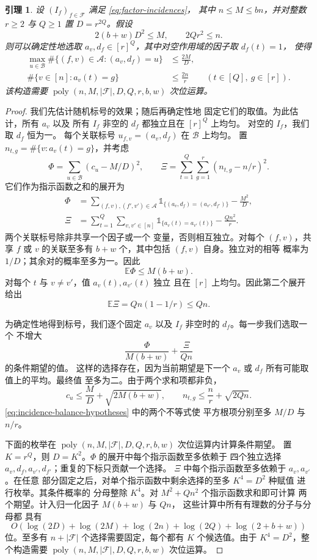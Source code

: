 \documentclass[11pt,reqno]{amsart}
\numberwithin{equation}{section}
\newtheorem{lemma}[theorem]{引理}
\theoremstyle{definition}\newtheorem{definition}[theorem]{定义}
\theoremstyle{remark}\newtheorem{remark}[theorem]{注}
\newcommand{\poly}{\operatorname{poly}}
\renewcommand{\le}{\leqslant}
\renewcommand{\ge}{\geqslant}
\begin{document}
\begin{lemma}\label{lem:incidence-labels}
设 $(I_f)_{f\in\mathcal F}$ 满足 \eqref{eq:factor-incidences}，
其中 $n\le M\le bn$，并对整数 $r\ge2$ 与
$Q\ge1$ 置 $D=r^{2Q}$。假设
\begin{equation}\label{eq:incidence-balance-hypotheses}
 2(b+w)D^2\le M,\qquad 2Qr^2\le n.
\end{equation}
则可以确定性地选取 $a_v,d_f\in[r]^Q$，其中对空作用域的因子取 $d_f(t)=1$，
使得
\[
 \begin{aligned}
 \max_{u\in\mathcal B}\#\{(f,v)\in\mathcal A:(a_v,d_f)=u\}
 &\le\frac{2M}{D},\\
 \#\{v\in[n]:a_v(t)=g\}&\le\frac{2n}{r}
 \qquad(t\in[Q],\ g\in[r]).
 \end{aligned}
\]
该构造需要
$\poly(n,M,|\mathcal F|,D,Q,r,b,w)$ 次位运算。
\end{lemma}
\begin{proof}
我们先估计随机标号的效果；随后再确定性地
固定它们的取值。为此估计，所有 $a_v$ 以及
所有 $I_f$ 非空的 $d_f$ 都独立且在 $[r]^Q$ 上均匀。
对空的 $I_f$，我们取 $d_f$ 恒为一。
每个关联标号 $u_{f,v}=(a_v,d_f)$ 在 $\mathcal B$ 上均匀。
置 $n_{t,g}=\#\{v:a_v(t)=g\}$，并考虑
\[
 \Phi=\sum_{u\in\mathcal B}(c_u-M/D)^2,
 \qquad
 \Xi=\sum_{t=1}^Q\sum_{g=1}^r(n_{t,g}-n/r)^2.
\]
它们作为指示函数之和的展开为
\[
 \begin{aligned}
 \Phi&=\sum_{(f,v),(f',v')\in\mathcal A}
       \mathds{1}_{\{(a_v,d_f)=(a_{v'},d_{f'})\}}-\frac{M^2}{D},\\
 \Xi&=\sum_{t=1}^Q\sum_{v,v'\in[n]}
       \mathds{1}_{\{a_v(t)=a_{v'}(t)\}}-\frac{Qn^2}{r}.
 \end{aligned}
\]
两个关联标号除非共享一个因子或一个
变量，否则相互独立。对每个 $(f,v)$，共享
$f$ 或 $v$ 的关联至多有 $b+w$ 个，其中包括 $(f,v)$ 自身。独立对的相等
概率为 $1/D$；其余对的概率至多为一。因此
\[
 \mathbb E\Phi\le M(b+w).
\]
对每个 $t$ 与 $v\ne v'$，值 $a_v(t),a_{v'}(t)$ 独立
且在 $[r]$ 上均匀。因此第二个展开给出
\[
 \mathbb E\Xi=Qn(1-1/r)\le Qn.
\]

为确定性地得到标号，我们逐个固定
$a_v$ 以及 $I_f$ 非空时的 $d_f$。每一步我们选取一个
不增大
\[
 \frac{\Phi}{M(b+w)}+\frac{\Xi}{Qn}
\]
的条件期望的值。
这样的选择存在，因为当前期望是下一个 $a_v$ 或 $d_f$
所有可能取值上的平均。最终值
至多为二。由于两个求和项都非负，
\[
 c_u\le\frac MD+\sqrt{2M(b+w)},\qquad
 n_{t,g}\le\frac nr+\sqrt{2Qn}.
\]
\eqref{eq:incidence-balance-hypotheses} 中的两个不等式使
平方根项分别至多 $M/D$ 与 $n/r$。

下面的枚举在
$\poly(n,M,|\mathcal F|,D,Q,r,b,w)$ 次位运算内计算条件期望。
置 $K=r^Q$，则 $D=K^2$。$\Phi$ 的展开中每个指示函数至多依赖于
四个独立选择
$a_v,d_f,a_{v'},d_{f'}$；重复的下标只贡献一个选择。
$\Xi$ 中每个指示函数至多依赖于 $a_v,a_{v'}$。在任意
部分固定之后，对单个指示函数中剩余选择的至多 $K^4=D^2$ 种赋值
进行枚举。其条件概率的
分母整除 $K^4$。对 $M^2+Qn^2$ 个指示函数求和即可计算
两个期望。计入归一化因子 $M(b+w)$ 与 $Qn$，
这些计算中所有有理数的分子与分母都
具有
\[
 O\!\left(\log(2D)+\log(2M)+\log(2n)+\log(2Q)+\log(2+b+w)\right)
\]
位。至多有 $n+|\mathcal F|$ 个选择需要固定，每个都有
$K$ 个候选值。由于 $K^4=D^2$，整个构造需要
$\poly(n,M,|\mathcal F|,D,Q,r,b,w)$ 次位运算。
\end{proof}
\end{document}
